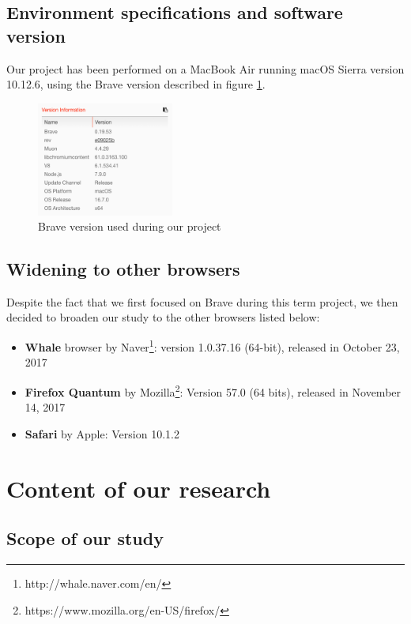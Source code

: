 \documentclass[journal]{IEEEtran}
\begin{document}
\subsection{Environment specifications and software version}

Our project has been performed on a MacBook Air running macOS Sierra version 10.12.6, using the Brave version described in figure \ref{fig:BraveVersion}.

\begin{figure}[h]
\centering
\includegraphics[width=0.4\textwidth]{images/BraveVersion.png}
\caption{Brave version used during our project}
\label{fig:BraveVersion}
\end{figure}


\subsection{Widening to other browsers}
\label{otherBrowsers}

Despite the fact that we first focused on Brave during this term project, we then decided to broaden our study to the other browsers listed below:

\begin{itemize}
\item \textbf{Whale} browser by Naver\footnote{http://whale.naver.com/en/}: version 1.0.37.16 (64-bit), released in October 23, 2017
\item \textbf{Firefox Quantum} by Mozilla\footnote{https://www.mozilla.org/en-US/firefox/}: Version 57.0 (64 bits), released in November 14, 2017
\item \textbf{Safari} by Apple: Version 10.1.2
\end{itemize}


\section{Content of our research}

\subsection{Scope of our study}
\end{document}
